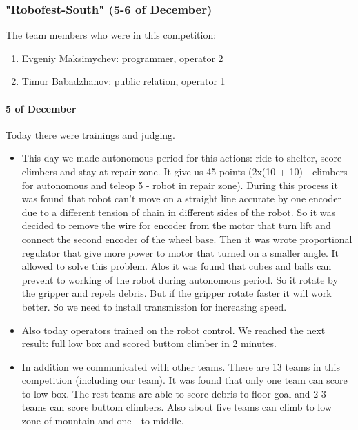 \subsubsection{"Robofest-South" (5-6 of December)}
The team members who were in this competition:
\begin{enumerate}
	\item Evgeniy Maksimychev: programmer, operator 2
	
	\item Timur Babadzhanov: public relation, operator 1 
\end{enumerate}
\paragraph{5 of December} 
Today there were trainings and judging.
\begin{itemize}
	\item This day we made autonomous period for this actions: ride to shelter, score climbers and stay at repair zone. It give us 45 points (2x(10 + 10) - climbers for autonomous and teleop 5 - robot in repair zone). During this process it was found that robot can't move on a straight line accurate by one encoder due to a different tension of chain in different sides of the robot. So it was decided to remove the wire for encoder from the motor that turn lift and connect the second encoder of the wheel base. Then it was wrote proportional regulator that give more power to motor that turned on a smaller angle. It allowed to solve this problem. Alos it was found that cubes and balls can prevent to working of the robot during autonomous period. So it rotate by the gripper and repels debris. But if the gripper rotate faster it will work better. So we need to install transmission for increasing speed.
	\item Also today operators trained on the robot control. We reached the next result: full low box and scored buttom climber in 2 minutes.
	\item In addition we communicated with other teams. There are 13 teams in this competition (including our team). It was found that only one team can score to low box. The rest teams are able to score debris to floor goal and 2-3 teams can score buttom climbers. Also about five teams can climb to low zone of mountain and one - to middle.
\end{itemize}
